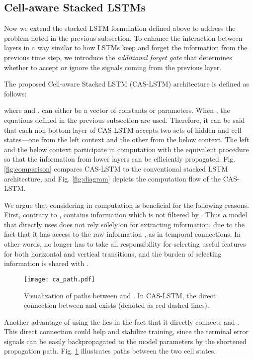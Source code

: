 \documentclass[wcp]{jmlr}
\begin{document}
    \subsection{Cell-aware Stacked LSTMs}
    Now we extend the stacked LSTM formulation defined above to address the problem noted in the previous subsection.
    To enhance the interaction between layers in a way similar to how LSTMs keep and forget the information from the previous time step, we introduce the \textit{additional forget gate}  that determines whether to accept or ignore the signals coming from the previous layer.
    
    The proposed Cell-aware Stacked LSTM (CAS-LSTM) architecture is defined as follows:
    
    where  and .
     can either be a vector of constants or parameters.
    When , the equations defined in the previous subsection are used.
    Therefore, it can be said that each non-bottom layer of CAS-LSTM accepts two sets of hidden and cell states---one from the left context and the other from the below context.
    The left and the below context participate in computation with the equivalent procedure so that the information from lower layers can be efficiently propagated.
    Fig. \ref{fig:comparison} compares CAS-LSTM to the conventional stacked LSTM architecture,
    and Fig. \ref{fig:diagram} depicts the computation flow of the CAS-LSTM.
    
    We argue that considering  in computation is beneficial for the following reasons.
    First, contrary to ,  contains information which is not filtered by .
    Thus a model that directly uses  does not rely solely on  for extracting information, due to the fact that it has access to the raw information , as in temporal connections.
    In other words,  no longer has to take all responsibility for selecting useful features for both horizontal and vertical transitions, and the burden of selecting information is shared with .
    
    \begin{figure}
        \centering
        \texttt{[image: ca\_path.pdf]}
        \caption{
            Visualization of paths between  and .
            In CAS-LSTM, the direct connection between  and  exists (denoted as red dashed lines).
        }
        \label{fig:ca_path}
    \end{figure}
    
    Another advantage of using the  lies in the fact that it directly connects  and .
    This direct connection could help and stabilize training, since the terminal error signals can be easily backpropagated to the model parameters by the shortened propagation path.
    Fig. \ref{fig:ca_path} illustrates paths between the two cell states.
    
\end{document}
